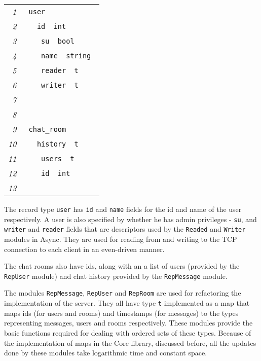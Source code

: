 \documentclass[12pt,twoside,notitlepage]{report}
\newcommand{\mlkeyword}[1]{\mbox{\color{red}{#1}}}
\newcommand{\mloperator}[1]{\mbox{\color{darkgreen}{#1}}}
\newcommand{\mlmodulename}[1]{\mbox{\color{navy}{#1}}}
\newcommand{\mlcodeline}[2]{\tiny\sl #1 & \begin{minipage}[c]{0.8\linewidth}\begin{alltt}\mbox{#2}\end{alltt}\end{minipage}\\}
\begin{document}
\begin{comment}

type user =
  { id : int;  
    su : bool;
    name : string;
    reader : Reader.t;
    writer : Writer.t;
  }

type chat_room = 
  { history : RepMessage.t;
    users : RepUser.t;
    id : int;
  }
  
\end{comment} 
  
{\scriptsize\noindent\begin{longtable}{r|l}
\mlcodeline{1}{\mlkeyword{type}~user~\mlkeyword{=}
}
\mlcodeline{2}{~~\mloperator{\{}~id~\mloperator{\mbox{\COLON}}~int\mloperator{\mbox{\SC}}~~
}
\mlcodeline{3}{~~~~su~\mloperator{\mbox{\COLON}}~bool\mloperator{\mbox{\SC}}
}
\mlcodeline{4}{~~~~name~\mloperator{\mbox{\COLON}}~string\mloperator{\mbox{\SC}}
}
\mlcodeline{5}{~~~~reader~\mloperator{\mbox{\COLON}}~\mlmodulename{Reader}\mbox{}\mloperator{.}t\mloperator{\mbox{\SC}}
}
\mlcodeline{6}{~~~~writer~\mloperator{\mbox{\COLON}}~\mlmodulename{Writer}\mbox{}\mloperator{.}t\mloperator{\mbox{\SC}}
}
\mlcodeline{7}{~~\mloperator{\}}
}
\mlcodeline{8}{
}
\mlcodeline{9}{\mlkeyword{type}~chat\_{}room~\mlkeyword{=}~
}
\mlcodeline{10}{~~\mloperator{\{}~history~\mloperator{\mbox{\COLON}}~\mlmodulename{RepMessage}\mbox{}\mloperator{.}t\mloperator{\mbox{\SC}}
}
\mlcodeline{11}{~~~~users~\mloperator{\mbox{\COLON}}~\mlmodulename{RepUser}\mbox{}\mloperator{.}t\mloperator{\mbox{\SC}}
}
\mlcodeline{12}{~~~~id~\mloperator{\mbox{\COLON}}~int\mloperator{\mbox{\SC}}
}
\mlcodeline{13}{~~\mloperator{\}}}
\end{longtable}
}

The record type {\tt user} has {\tt id} and {\tt name} fields for the id and name of the user respectively. A user is also specified by whether he has admin privileges - {\tt su}, and {\tt writer} and {\tt reader} fields that are descriptors used by the {\tt Readed} and {\tt Writer} modules in Async. They are used for reading from and writing to the TCP connection to each client in an even-driven manner.

The chat rooms also have ids, along with an a list of users (provided by the {\tt RepUser} module) and chat history provided by the {\tt RepMessage} module.

The modules {\tt RepMessage}, {\tt RepUser} and {\tt RepRoom} are used for refactoring the implementation of the server. They all have type {\tt t} implemented as a map that maps ids (for users and rooms) and timestamps (for messages) to the types representing messages, users and rooms respectively. These modules provide the basic functions required for dealing with ordered sets of these types. Because of the implementation of maps in the Core library, discussed before, all the updates done by these modules take logarithmic time and constant space.     
\end{document}
